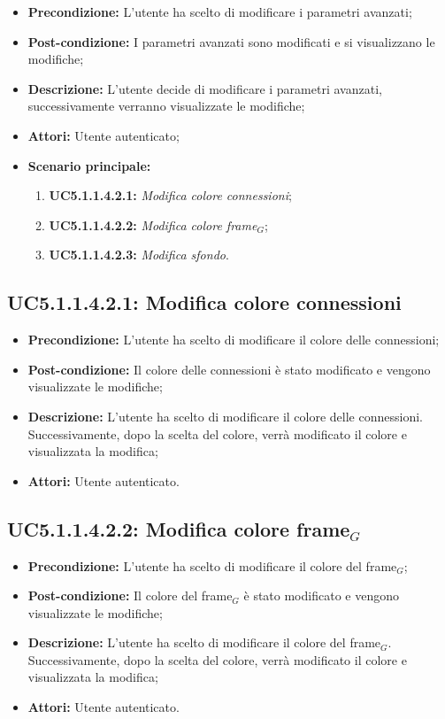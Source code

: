 \begin{itemize}
	\item \textbf{Precondizione:} L'utente ha scelto di modificare i parametri avanzati;
	\item \textbf{Post-condizione:} I parametri avanzati sono modificati e si visualizzano le modifiche;
	\item \textbf{Descrizione:} L'utente decide di modificare i parametri avanzati, successivamente verranno visualizzate le modifiche;
	\item \textbf{Attori:} Utente autenticato;
	\item \textbf{Scenario principale:}
	\begin{enumerate}
		\item \textbf{ UC5.1.1.4.2.1:} \textit{ Modifica colore connessioni};
		\item \textbf{ UC5.1.1.4.2.2:} \textit{ Modifica colore frame$_G$};
		\item \textbf{ UC5.1.1.4.2.3:} \textit{ Modifica sfondo}.
	\end{enumerate}
\end{itemize}
\subsection{ UC5.1.1.4.2.1: Modifica colore connessioni}

\begin{itemize}
	\item \textbf{Precondizione:} L'utente ha scelto di modificare il colore delle connessioni;
	\item \textbf{Post-condizione:} Il colore delle connessioni è stato modificato e vengono visualizzate le modifiche;
	\item \textbf{Descrizione:} L'utente ha scelto di modificare il colore delle connessioni.  Successivamente, dopo la scelta del colore, verrà modificato il colore e visualizzata la modifica;
	\item \textbf{Attori:} Utente autenticato.
\end{itemize}
\subsection{ UC5.1.1.4.2.2: Modifica colore frame$_G$}

\begin{itemize}
	\item \textbf{Precondizione:} L'utente ha scelto di modificare il colore del frame$_G$;
	\item \textbf{Post-condizione:} Il colore del frame$_G$ è stato modificato e vengono visualizzate le modifiche;
	\item \textbf{Descrizione:} L'utente ha scelto di modificare il colore del frame$_G$.  Successivamente, dopo la scelta del colore, verrà modificato il colore e visualizzata la modifica;
	\item \textbf{Attori:} Utente autenticato.
\end{itemize}
